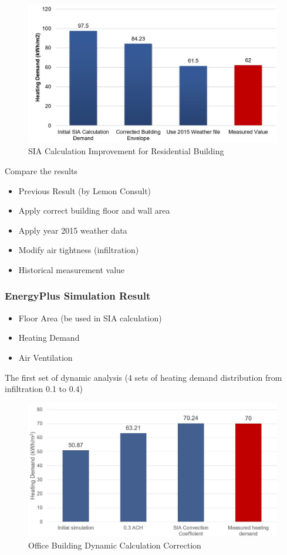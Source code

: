 \documentclass[11pt, a4paper]{article}
\theoremstyle{definition}
\begin{document}
		\begin{figure}[h!]
		\centering
		\includegraphics[scale=0.4]{Residential_SIA.jpg}
		\caption{SIA Calculation Improvement for Residential Building}
		\label{fig:Hongger_SIA}
		\end{figure}
		
		
		Compare the results
			\begin{itemize}
			 	\item Previous Result (by Lemon Consult)
			 	\item Apply correct building floor and wall area
			 	\item Apply year 2015 weather data
			 	\item Modify air tightness (infiltration)
			 	\item Historical measurement value
			 \end{itemize}
			  
		\subsubsection{EnergyPlus Simulation Result}		
		\begin{itemize}
			\item Floor Area (be used in SIA calculation)
			\item Heating Demand
			\item Air Ventilation
		\end{itemize}
		The first set of dynamic analysis (4 sets of heating demand distribution from infiltration 0.1 to 0.4)

		\begin{figure}[H]
		\centering
		\includegraphics[scale=0.5]{Office_EP.jpg}
		\caption{Office Building Dynamic Calculation Correction}
		\label{fig:Sumatra_EP}
		\end{figure}
\end{document}
